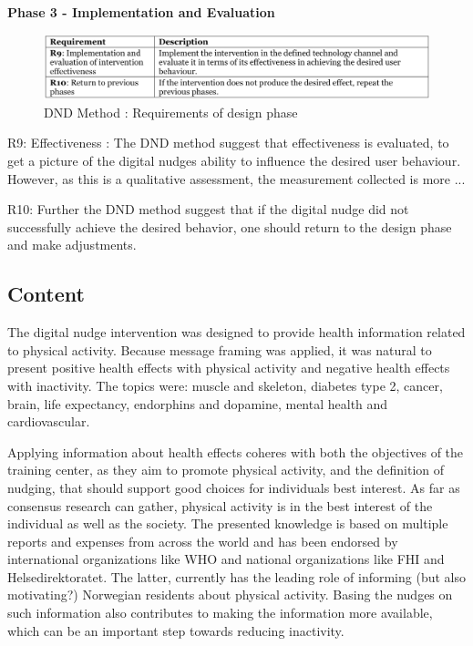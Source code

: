 \textbf{Phase 3 - Implementation and Evaluation }
\bigbreak
\begin{figure}[ht]
\includegraphics[width=1\textwidth]{images/Phase3.png}
\caption{DND Method : Requirements of design phase }
\end{figure}
\bigbreak
\bigbreak
R9: 
Effectiveness : The DND method suggest that effectiveness is evaluated, to get a picture of the digital nudges ability to influence the desired user behaviour. However, as this is a qualitative assessment, the measurement collected is more ...

R10: 
Further the DND method suggest that if the digital nudge did not successfully achieve the desired behavior, one should return to the design phase and make adjustments.   

\subsection{Content}
The digital nudge intervention was designed to provide health information related to physical activity. Because message framing was applied, it was natural to present positive health effects with physical activity and negative health effects with inactivity. The topics were: muscle and skeleton, diabetes type 2, cancer, brain, life expectancy, endorphins and dopamine, mental health and cardiovascular. 

Applying information about health effects coheres with both the objectives of the training center, as they aim to promote physical activity, and the definition of nudging, that should support good choices for individuals best interest. As far as consensus research can gather, physical activity is in the best interest of the individual as well as the society. 
The presented knowledge is based on multiple reports and expenses from across the world and has been endorsed by international organizations like WHO and national organizations like FHI and Helsedirektoratet. The latter, currently has the leading role of informing (but also motivating?) Norwegian residents about physical activity. Basing the nudges on such information also contributes to making the information more available, which can be an important step towards reducing inactivity.

